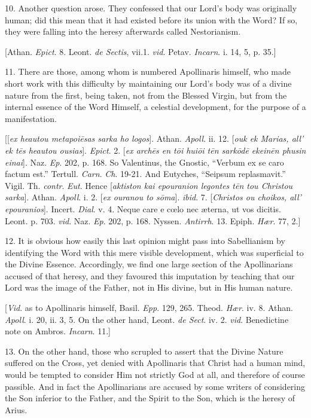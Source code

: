 10. Another question arose. They confessed that our Lord's body was
originally human; did this mean that it had existed before its union
with the Word? If so, they were falling into the heresy afterwards
called Nestorianism.

[Athan. \emph{Epict}. 8. Leont. \emph{de Sectis}, vii.1. \emph{vid}.
Petav. \emph{Incarn}. i. 14, 5, p. 35.]

11. There are those, among whom is numbered Apollinaris himself,
who made short work with this difficulty by maintaining our Lord's
body was of a divine nature from the first, being taken, not from the
Blessed Virgin, but from the internal essence of the Word Himself, a
celestial development, for the purpose of a manifestation.

[[\emph{ex heautou metapoi\={e}sas sarka ho logos}]. Athan. \emph{Apoll}.
ii. 12. [\emph{ouk ek Marias, all' ek t\={e}s heautou ousias}]. \emph{Epict}.
2. [\emph{ex arch\={e}s en t\={o}i hui\={o}i t\={e}n sark\={o}d\={e}
ekein\={e}n phusin einai}]. Naz. \emph{Ep}. 202, p. 168. So
Valentinus, the Gnostic, ``Verbum ex se caro factum est.''
Tertull. \emph{Carn}. \emph{Ch}. 19-21. And Eutyches, ``Seipsum
replasmavit.'' Vigil. Th. \emph{contr}. \emph{Eut}. Hence [\emph{aktiston
kai epouranion legontes t\={e}n tou Christou sarka}]. Athan. \emph{Apoll}.
i. 2. [\emph{ex ouranou to s\={o}ma}]. \emph{ibid}. 7. [\emph{Christos
ou choikos, all' epouranios}]. Incert. \emph{Dial}. v. 4. Neque
care e cœlo nec æterna, ut vos dicitis. Leont. p. 703. \emph{vid}.
Naz. \emph{Ep}. 202, p. 168. Nyssen. \emph{Antirrh}. 13. Epiph. \emph{Hær}.
77, 2.]

12. It is obvious how easily this last opinion might pass into
Sabellianism by identifying the Word with this mere visible
development, which was superficial to the Divine Essence. Accordingly,
we find one large section of the Apollinarians accused of that heresy,
and they favoured this imputation by teaching that our Lord was the
image of the Father, not in His divine, but in His human nature.

[\emph{Vid}. as to Apollinaris himself, Basil. \emph{Epp}. 129,
265. Theod. \emph{Hær}. iv. 8. Athan. \emph{Apoll}. i. 20, ii. 3, 5.
On the other hand, Leont. \emph{de Sect}. iv. 2. \emph{vid}.
Benedictine note on Ambros. \emph{Incarn}. 11.]

13. On the other hand, those who scrupled to assert that the Divine
Nature suffered on the Cross, yet denied with Apollinaris that Christ
had a human mind, would be tempted to consider Him not strictly
God at all, and therefore of course passible. And in fact the
Apollinarians are accused by some writers of considering the Son
inferior to the Father, and the Spirit to the Son, which is the heresy
of Arius.

